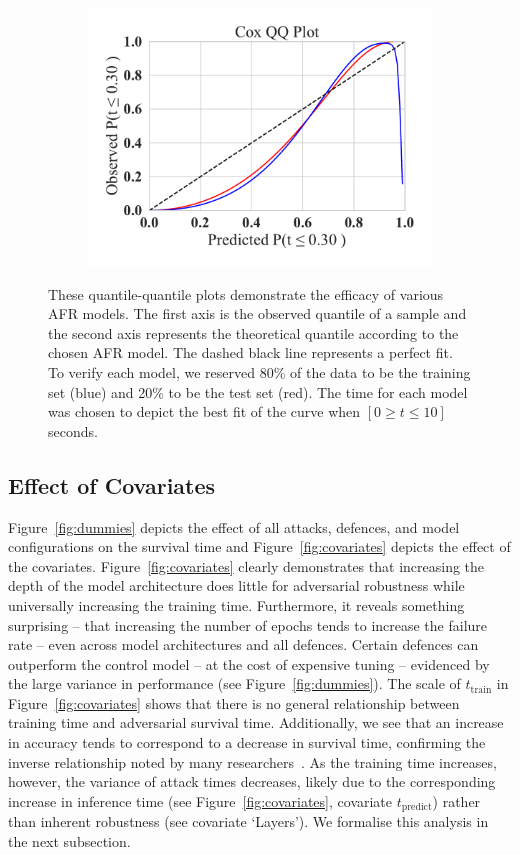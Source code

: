 \begin{figure}
\begin{subfigure}
	\end{subfigure}
	\begin{subfigure}
		\centering
		\includegraphics[width=.30\textwidth,trim={20pt 20pt 20pt 20pt},clip]{plots/cox_qq.pdf}
	\end{subfigure}
	\caption{These quantile-quantile plots demonstrate the efficacy of various AFR models. The first axis is the observed quantile of a sample and the second axis represents the theoretical quantile according to the chosen AFR model. The dashed black line represents a perfect fit. To verify each model, we reserved 80\% of the data to be the training set (blue) and 20\% to be the test set (red). The time for each model was chosen to depict the best fit of the curve when $ [ 0 \geq t \leq 10 ] $ seconds.
 }
	\label{fig:afr_models}
\end{figure}

\subsection{Effect of Covariates}
Figure~\ref{fig:dummies} depicts the effect of all attacks, defences, and model configurations on the survival time and Figure~\ref{fig:covariates} depicts the effect of the covariates.
Figure~\ref{fig:covariates} clearly demonstrates that increasing the depth of the model architecture does little for adversarial robustness while universally increasing the training time.
Furthermore, it reveals something surprising -- that increasing the number of epochs tends to increase the failure rate -- even across model architectures and all defences.
Certain defences can outperform the control model -- at the cost of expensive tuning -- evidenced by the large variance in performance (see Figure~\ref{fig:dummies}). The scale of $t_{\mathrm{train}}$  in Figure~\ref{fig:covariates} shows that there is no general relationship between training time and adversarial survival time. Additionally, we see that an increase in accuracy tends to correspond to a decrease in survival time, confirming the inverse relationship noted by many researchers~\cite{carlini_towards_2017,biggio_evasion_2013,croce_reliable_2020}.
As the training time increases, however, the variance of attack times decreases, likely due to the corresponding increase in inference time (see Figure~\ref{fig:covariates}, covariate $t_{\mathrm{predict}}$) rather than inherent robustness (see covariate `Layers').
We formalise this analysis in the next subsection.

